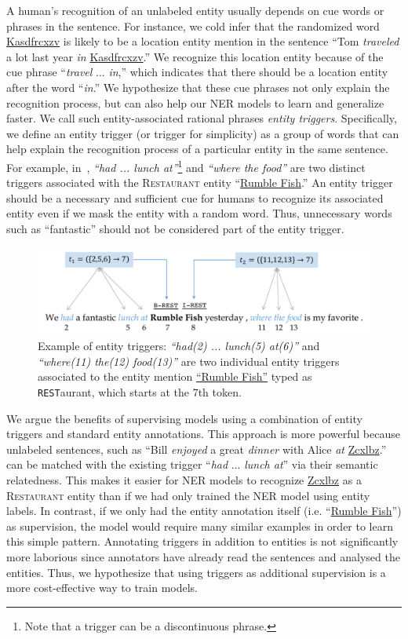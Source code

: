 A human's recognition of an unlabeled entity usually depends on cue words or  phrases in the sentence. For instance, we cold infer that the randomized word \underline{Kasdfrcxzv} is likely to be a location entity mention in the sentence ``Tom \textit{traveled} a lot last year \textit{in} \underline{Kasdfrcxzv}.'' We recognize this location entity because of the cue phrase ``\textit{travel} ... \textit{in},'' which indicates that there should be a location entity after the word ``\textit{in}.'' We hypothesize that these cue phrases not only explain the recognition process, but can also help our NER models to learn and generalize faster. We call such entity-associated rational phrases \textit{entity triggers}. Specifically, we define an entity trigger (or trigger for simplicity) as a group of words that can help explain the recognition process of a particular entity in the same sentence. For example, in~, \textit{``had ... lunch at''}\footnote{Note that a trigger can be a discontinuous phrase.} and \textit{``where the food''} are two distinct triggers associated with the \textsc{Restaurant} entity ``\underline{Rumble Fish}.'' An entity trigger should be a necessary and sufficient cue for humans to recognize its associated entity even if we mask the entity with a random word. Thus, unnecessary words such as ``fantastic'' should not be  considered part of the entity trigger.

\begin{figure}[h]
	\centering
	\includegraphics[width=0.85\linewidth]{LatexDiss/figures/trigexample.pdf}
	\caption{Example of entity triggers: \textit{``had(2) ... lunch(5) at(6)''} and \textit{``where(11) the(12) food(13)''} are two individual entity triggers associated to the entity mention {\underline{``Rumble Fish''}} typed as \texttt{REST}aurant, which starts at the 7th token.}
	\label{fig:trigex}
\end{figure}

We argue the benefits of supervising models using a combination of entity triggers and standard entity annotations. This approach is more powerful because unlabeled sentences, such as ``Bill \textit{enjoyed} a great \textit{dinner} with Alice \textit{at} \underline{Zcxlbz}.'' can be matched with the existing trigger ``\textit{had} ... \textit{lunch at}'' via their semantic relatedness. This makes it easier for NER models to recognize \underline{Zcxlbz} as a \textsc{Restaurant} entity than if we had only trained the NER model using entity labels. In contrast, if we only had the entity annotation itself (i.e. ``\underline{Rumble Fish}'') as supervision, the model would require many similar examples in order to learn this simple pattern. Annotating triggers in addition to entities is not significantly more laborious since annotators have already read the sentences and analysed the entities. Thus, we hypothesize that using triggers as additional supervision is a more cost-effective way to train models.

